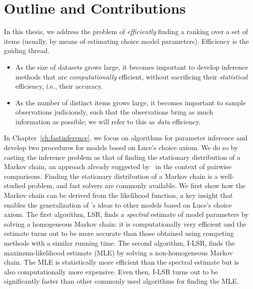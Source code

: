 \section{Outline and Contributions}
\label{in:sec:outline}

In this thesis, we address the problem of \emph{efficiently} finding a ranking over a set of items (usually, by means of estimating choice model parameters).
Efficiency is the guiding thread.
\begin{itemize}
\item As the size of datasets grows large, it becomes important to develop inference methods that are \emph{computationally} efficient, without sacrificing their \emph{statistical} efficiency, i.e., their accuracy.
\item As the number of distinct items grows large, it becomes important to sample observations judiciously, such that the observations bring as much information as possible; we will refer to this as \emph{data} efficiency.
\end{itemize}

In Chapter~\ref{ch:fastinference}, we focus on algorithms for parameter inference and develop two procedures for models based on Luce's choice axiom.
We do so by casting the inference problem as that of finding the stationary distribution of a Markov chain, an approach already suggested by~\citet{negahban2012iterative} in the context of pairwise comparisons.
Finding the stationary distribution of a Markov chain is a well-studied problem, and fast solvers are commonly available.
We first show how the Markov chain can be derived from the likelihood function, a key insight that enables the generalization of \citeauthor{negahban2012iterative}'s ideas to other models based on Luce's choice axiom.
The first algorithm, LSR, finds a \emph{spectral} estimate of model parameters by solving a homogeneous Markov chain: it is computationally very efficient and the estimate turns out to be more accurate than those obtained using competing methods with a similar running time.
The second algorithm, I-LSR, finds the maximum-likelihood estimate (MLE) by solving a non-homogeneous Markov chain.
The MLE is statistically more efficient than the spectral estimate but is also computationally more expensive.
Even then, I-LSR turns out to be significantly faster than other commonly used algorithms for finding the MLE.

